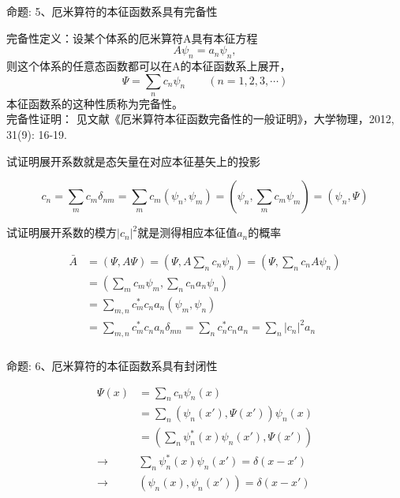 \begin{frame} [allowframebreaks=]
    \frametitle{}
    \begin{tcolorbox1}{命题:}
        5、厄米算符的本征函数系具有完备性
     \end{tcolorbox1}
    \alert{完备性定义：}设某个体系的厄米算符A具有本征方程
    \begin{equation*}
        A\psi_{n}=a_n\psi_{n}, 
    \end{equation*}  
    则这个体系的任意态函数都可以在A的本征函数系上展开，
    \begin{equation*}
        \Psi=\sum_n c_n \psi_{n} \qquad (n=1,2,3,\cdots)
    \end{equation*}
    本征函数系的这种性质称为完备性。\\
    完备性证明： 见文献《厄米算符本征函数完备性的一般证明》，大学物理，2012, 31(9): 16-19.
    \begin{exampleblock}{}
        试证明展开系数就是态矢量在对应本征基矢上的投影
    \end{exampleblock}
    \begin{equation*}
        c_n=\sum_m c_m\delta_{nm} = \sum_m c_m(\psi_n, \psi_m)= (\psi_n, \sum_m c_m\psi_m) =(\psi_n, \Psi)
    \end{equation*}
    \begin{exampleblock}{}
        试证明展开系数的模方$|c_n|^2$就是测得相应本征值$a_n$的概率
    \end{exampleblock}
    \begin{equation*}
        \begin{split}
            \bar{A}&=(\Psi, A\Psi)=(\Psi, A\sum_n c_n \psi_{n})=(\Psi, \sum_n c_n A\psi_{n})\\
            &=(\sum_m c_m \psi_{m}, \sum_n c_n a_n \psi_{n})\\
            &=\sum_{m,n} c_m^* c_n a_n (\psi_m, \psi_n)\\
            &=\sum_{m,n} c_m^* c_n a_n \delta_{mn}=\sum_{n} c_n^* c_n a_n =\sum_{n} |c_n|^2 a_n 
        \end{split}
    \end{equation*}
\end{frame} 

\begin{frame} [allowframebreaks=]
    \frametitle{}
    \begin{tcolorbox1}{命题:}
        6、厄米算符的本征函数系具有封闭性
     \end{tcolorbox1}
    \begin{equation*}
        \begin{split}
            \Psi(x)&=\sum_n c_n \psi_{n}(x) \\
            &=\sum_n (\psi_n(x'), \Psi(x')) \psi_{n}(x)\\
            &= (\sum_n\psi_{n} ^* (x)\psi_n(x'), \Psi(x')) \\
            \to &\sum_n\psi_{n} ^* (x)\psi_n(x')=\delta(x-x')\\
            \to &(\psi_{n}(x),\psi_n(x'))=\delta(x-x')
        \end{split} 
    \end{equation*}
\end{frame} 

